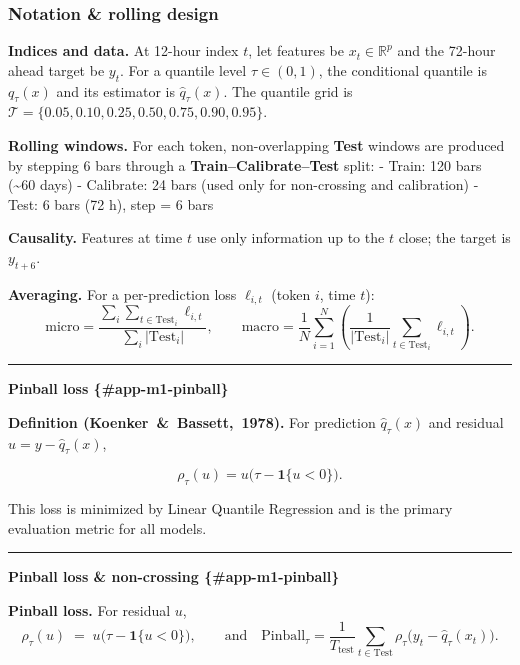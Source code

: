 \documentclass[
  a4paper,
  DIV=11,
  numbers=noendperiod]{scrreprt}
\begin{document}
\subsubsection{Notation \& rolling design}\label{app-m0-notation}

\textbf{Indices and data.} At 12-hour index \(t\), let features be
\(x_t\in\mathbb{R}^p\) and the 72-hour ahead target be \(y_t\). For a
quantile level \(\tau\in(0,1)\), the conditional quantile is
\(q_\tau(x)\) and its estimator is \(\widehat q_\tau(x)\). The quantile
grid is \(\mathcal T=\{0.05,0.10,0.25,0.50,0.75,0.90,0.95\}\).

\textbf{Rolling windows.} For each token, non-overlapping \textbf{Test}
windows are produced by stepping 6 bars through a
\textbf{Train--Calibrate--Test} split: - Train: 120 bars
(\textasciitilde60 days) - Calibrate: 24 bars (used only for
non-crossing and calibration) - Test: 6 bars (72 h), step = 6 bars

\textbf{Causality.} Features at time \(t\) use only information up to
the \(t\) close; the target is \(y_{t+6}\).

\textbf{Averaging.} For a per-prediction loss \(\ell_{i,t}\) (token
\(i\), time \(t\)): \[
\text{micro}=\frac{\sum_i\sum_{t\in\mathrm{Test}_i}\ell_{i,t}}{\sum_i|\mathrm{Test}_i|},
\qquad
\text{macro}=\frac{1}{N}\sum_{i=1}^N \left(\frac{1}{|\mathrm{Test}_i|}\sum_{t\in\mathrm{Test}_i}\ell_{i,t}\right).
\]

\begin{center}\rule{0.5\linewidth}{0.5pt}\end{center}

\textbf{Pinball loss \{\#app-m1-pinball\}}

\textbf{Definition (Koenker~\&~Bassett,~1978).} For prediction
\(\widehat q_{\tau}(x)\) and residual \(u=y-\widehat q_{\tau}(x)\),

\[
\rho_{\tau}(u) = u\big(\tau - \mathbf{1}\{u<0\}\big).
\]

This loss is minimized by Linear Quantile Regression and is the primary
evaluation metric for all models.

\begin{center}\rule{0.5\linewidth}{0.5pt}\end{center}

\textbf{Pinball loss \& non-crossing \{\#app-m1-pinball\}}

\textbf{Pinball loss.} For residual \(u\), \[
\rho_\tau(u) \;=\; u\big(\tau-\mathbf{1}\{u<0\}\big),
\qquad
\text{and}\quad 
\text{Pinball}_\tau=\frac{1}{T_\text{test}}\sum_{t\in\mathrm{Test}}\rho_\tau\!\big(y_t-\widehat q_\tau(x_t)\big).
\]
\end{document}
